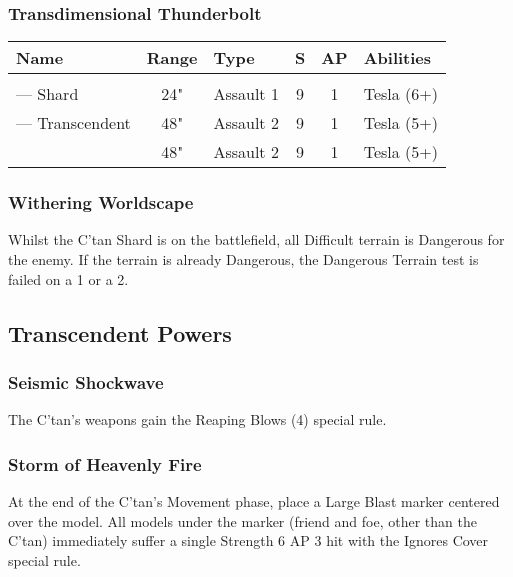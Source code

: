 \subsubsection{Transdimensional Thunderbolt} \label{Transdimensional Thunderbolt}

\noindent
\begin{NiceTabular}{L{115 pt} c C{40pt} *{2}{c} >{\raggedright\arraybackslash}p{240pt}}
	Name & Range & Type & S & AP & Abilities \\
	\hline
	 &  &  &  &  & \\
	— Shard & 24" & Assault 1 & 9 & 1 & Tesla (6+) \\
	 — Transcendent & 48" & Assault 2 & 9 & 1 & Tesla (5+) \\ & 48" & Assault 2 & 9 & 1 & Tesla (5+) \\
\end{NiceTabular}


\subsubsection{Withering Worldscape} \label{Withering Worldscape}

Whilst the C'tan Shard is on the battlefield, all Difficult terrain is Dangerous for the enemy. If the terrain is already Dangerous, the Dangerous Terrain test is failed on a 1 or a 2.


\subsection{Transcendent Powers}

\subsubsection{Seismic Shockwave} \label{Seismic Shockwave}

The C'tan's weapons gain the Reaping Blows (4) special rule.

\subsubsection{Storm of Heavenly Fire} \label{Storm of Heavenly Fire}

At the end of the C'tan's Movement phase, place a Large Blast marker centered over the model. All models under the marker (friend and foe, other than the C'tan) immediately suffer a single Strength 6 AP 3 hit with the Ignores Cover special rule.

